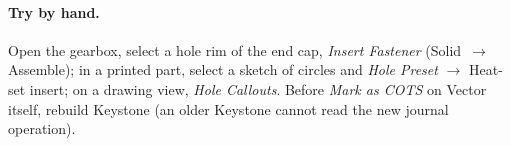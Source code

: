 \paragraph{Try by hand.} Open the gearbox, select a hole rim of the end cap, \emph{Insert Fastener}
(Solid~$\rightarrow$ Assemble); in a printed part, select a sketch of circles and \emph{Hole Preset}
$\rightarrow$ Heat-set insert; on a drawing view, \emph{Hole Callouts}. Before \emph{Mark as COTS} on
Vector itself, rebuild Keystone (an older Keystone cannot read the new journal operation).
